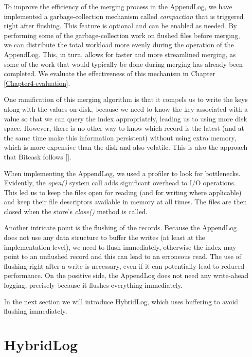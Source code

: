To improve the efficiency of the merging process in the AppendLog, we have implemented a garbage-collection mechanism called \textit{compaction} that is triggered right after flushing. This feature is optional and can be enabled as needed. By performing some of the garbage-collection work on flushed files before merging, we can distribute the total workload more evenly during the operation of the AppendLog. This, in turn, allows for faster and more streamlined merging, as some of the work that would typically be done during merging has already been completed. We evaluate the effectiveness of this mechanism in Chapter \ref{Chapter4-evaluation}.

One ramification of this merging algorithm is that it compels us to write the keys along with the values on disk, because we need to know the key associated with a value so that we can query the index appropriately, leading us to using more disk space. However, there is no other way to know which record is the latest (and at the same time make this information persistent) without using extra memory, which is more expensive than the disk and also volatile. This is also the approach that Bitcask follows [\cite{bitcask}].

When implementing the AppendLog, we used a profiler to look for bottlenecks. Evidently, the \textit{open()} system call adds significant overhead to I/O operations. This led us to keep the files open for reading (and for writing where applicable) and keep their file descriptors available in memory at all times. The files are then closed when the store's \textit{close()} method is called.

Another intricate point is the flushing of the records. Because the AppendLog does not use any data structure to buffer the writes (at least at the implementation level), we need to flush immediately, otherwise the index may point to an unflushed record and this can lead to an erroneous read. The use of flushing right after a write is necessary, even if it can potentially lead to reduced performance. On the positive side, the AppendLog does not need any write-ahead logging, precisely because it flushes everything immediately.

In the next section we will introduce HybridLog, which uses buffering to avoid flushing immediately.

\section{HybridLog}

